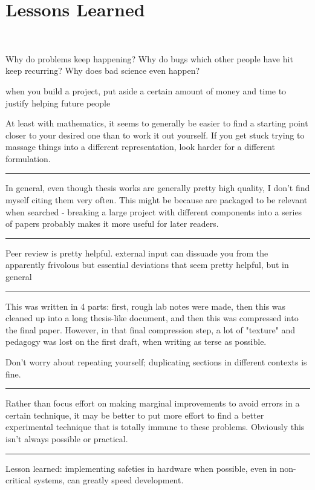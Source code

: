 \documentclass[paper.tex]{subfiles}
\begin{document}
\section{Lessons Learned} \


Why do problems keep happening? Why do bugs which other people have hit keep recurring? Why does bad science even happen?


when you build a project, put aside a certain amount of money and time to justify helping future people 


At least with mathematics, it seems to generally be easier to find a starting point closer to your desired one than to work it out yourself. If you get stuck trying to massage things into a different representation, look harder for a different formulation.

\rule{\linewidth}{0.2pt}

In general, even though thesis works are generally pretty high quality, I don't find myself citing them very often. This might be because are packaged to be relevant when searched - breaking a large project with different components into a series of papers probably makes it more useful for later readers.

\rule{\linewidth}{0.2pt}

Peer review is pretty helpful. external input can dissuade you from the apparently frivolous but essential deviations that seem pretty helpful, but in general 

\rule{\linewidth}{0.2pt}

This was written in 4 parts: first, rough lab notes were made, then this was cleaned up into a long thesis-like document, and then this was compressed into the final paper. However, in that final compression step, a lot of "texture" and pedagogy was lost on the first draft, when writing as terse as possible. 

Don't worry about repeating yourself; duplicating sections in different contexts is fine.

\rule{\linewidth}{0.2pt}

Rather than focus effort on making marginal improvements to avoid errors in a certain technique, it may be better to put more effort to find a better experimental technique that is totally immune to these problems. Obviously this isn't always possible or practical.


\rule{\linewidth}{0.2pt}


Lesson learned: implementing safeties in hardware when possible, even in non-critical systems, can greatly speed development.
\end{document}
